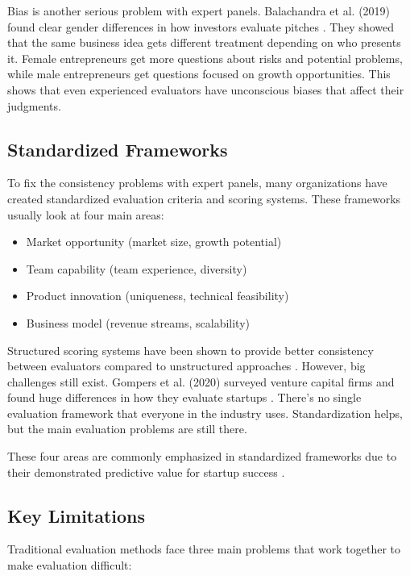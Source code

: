 Bias is another serious problem with expert panels. Balachandra et al. (2019) found clear gender differences in how investors evaluate pitches \cite{Balachandra2019}. They showed that the same business idea gets different treatment depending on who presents it. Female entrepreneurs get more questions about risks and potential problems, while male entrepreneurs get questions focused on growth opportunities. This shows that even experienced evaluators have unconscious biases that affect their judgments.

\subsection{Standardized Frameworks}\label{subsec:standardized-frameworks}
To fix the consistency problems with expert panels, many organizations have created standardized evaluation criteria and scoring systems. These frameworks usually look at four main areas:
\begin{itemize}
    \item Market opportunity (market size, growth potential)
    \item Team capability (team experience, diversity)
    \item Product innovation (uniqueness, technical feasibility)
    \item Business model (revenue streams, scalability)
\end{itemize}

Structured scoring systems have been shown to provide better consistency between evaluators compared to unstructured approaches \cite{Tsay2021VISUALSDI}. However, big challenges still exist. Gompers et al. (2020) surveyed venture capital firms and found huge differences in how they evaluate startups \cite{Gompers2020}. There's no single evaluation framework that everyone in the industry uses. Standardization helps, but the main evaluation problems are still there.

These four areas are commonly emphasized in standardized frameworks due to their demonstrated predictive value for startup success \cite{Kalvapalle2024}.

\subsection{Key Limitations}\label{subsec:key-limitations}
Traditional evaluation methods face three main problems that work together to make evaluation difficult:

